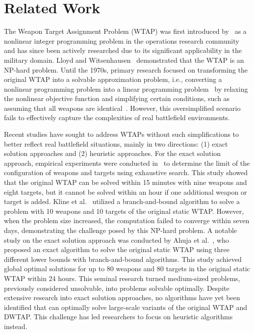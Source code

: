 \documentclass{ieeeaccess}
\begin{document}
\section{Related Work}
\label{sec:related}

The Weapon Target Assignment Problem (WTAP) was first introduced by~\cite{manne1958target} as a nonlinear integer programming problem in the operations research community and has since been actively researched due to its significant applicability in the military domain. Lloyd and Witsenhausen~\cite{lloyd1986weapons} demonstrated that the WTAP is an NP-hard problem. Until the 1970s, primary research focused on transforming the original WTAP into a solvable approximation problem, i.e., converting a nonlinear programming problem into a linear programming problem~\cite{day1966allocating, firstman1960approximating, ill1971linear, bracken1968selected, manne1958target, denbroeder1959optimum} by relaxing the nonlinear objective function and simplifying certain conditions, such as assuming that all weapons are identical~\cite{manne1958target, denbroeder1959optimum}. However, this oversimplified scenario fails to effectively capture the complexities of real battlefield environments.

Recent studies have sought to address WTAPs without such simplifications to better reflect real battlefield situations, mainly in two directions: (1) exact solution approaches and (2) heuristic approaches. For the exact solution approach, empirical experiments were conducted in~\cite{johansson2009empirical} to determine the limit of the configuration of weapons and targets using exhaustive search. This study showed that the original WTAP can be solved within 15 minutes with nine weapons and eight targets, but it cannot be solved within an hour if one additional weapon or target is added. Kline et al.~\cite{kline2019weapon} utilized a branch-and-bound algorithm to solve a problem with 10 weapons and 10 targets of the original static WTAP. However, when the problem size increased, the computation failed to converge within seven days, demonstrating the challenge posed by this NP-hard problem. A notable study on the exact solution approach was conducted by Ahuja et al.~\cite{ahuja2007exact}, who proposed an exact algorithm to solve the original static WTAP using three different lower bounds with branch-and-bound algorithms. This study achieved global optimal solutions for up to 80 weapons and 80 targets in the original static WTAP within 24 hours. This seminal research turned medium-sized problems, previously considered unsolvable, into problems solvable optimally. Despite extensive research into exact solution approaches, no algorithms have yet been identified that can optimally solve large-scale variants of the original WTAP and DWTAP. This challenge has led researchers to focus on heuristic algorithms instead.
\end{document}
